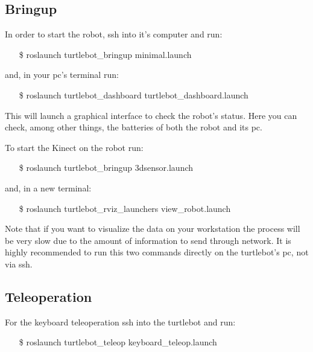 \documentclass[a4paper,10pt]{article}
\begin{document}
\subsection{Bringup}
In order to start the robot, ssh into it's computer and run:
\begin{shaded}
	\begin{itemize}
		\item[\$] roslaunch turtlebot\_bringup minimal.launch
	\end{itemize}
\end{shaded}
and, in your pc's terminal run:
\begin{shaded}
	\begin{itemize}
		\item[\$] roslaunch turtlebot\_dashboard turtlebot\_dashboard.launch
	\end{itemize}
\end{shaded}
This will launch a graphical interface to check the robot's status. Here you can check, among other things, the batteries of both the robot and its pc.

To start the Kinect on the robot run:
\begin{shaded}
	\begin{itemize}
		\item[\$] roslaunch turtlebot\_bringup 3dsensor.launch
	\end{itemize}
\end{shaded}
and, in a new terminal:
\begin{shaded}
	\begin{itemize}
		\item[\$] roslaunch turtlebot\_rviz\_launchers view\_robot.launch
	\end{itemize}
\end{shaded}
Note that if you want to visualize the data on your workstation the process will be very slow due to the amount of information to send through network. It is highly recommended to run this two commands directly on the turtlebot's pc, not via ssh.

\subsection{Teleoperation}
For the keyboard teleoperation ssh into the turtlebot and run:
\begin{shaded}
	\begin{itemize}
		\item[\$] roslaunch turtlebot\_teleop keyboard\_teleop.launch
	\end{itemize}
\end{shaded}
\end{document}
